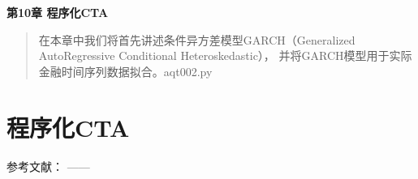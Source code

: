 \documentclass{article}
\begin{document}
\maketitle\begin{center}
\Large \textbf{第10章 程序化CTA}
\end{center}
\begin{abstract}
在本章中我们将首先讲述条件异方差模型GARCH（Generalized AutoRegressive Conditional Heteroskedastic），
并将GARCH模型用于实际金融时间序列数据拟合。aqt002.py
\end{abstract}
\section{程序化CTA}



参考文献：
\cite{ex1}---\cite{ex2}---\cite{refa001}

\newpage




\appendix
\end{document}

